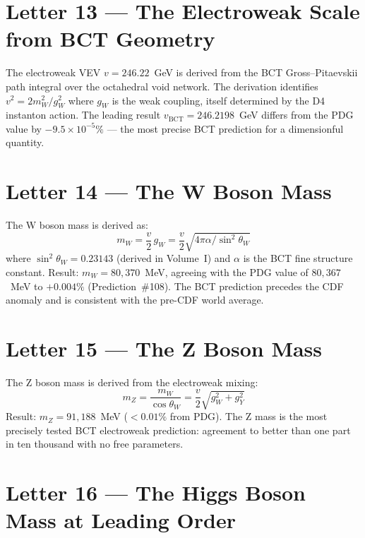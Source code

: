 \documentclass[aps,prl,twocolumn,showpacs,preprintnumbers]{revtex4-2}
\begin{document}
\section{Letter 13 --- The Electroweak Scale from BCT Geometry}

\medskip
The electroweak VEV $v = 246.22$~GeV is derived from the BCT
Gross--Pitaevskii path integral over the octahedral void network.
The derivation identifies $v^2 = 2m_W^2/g_W^2$ where $g_W$ is
the weak coupling, itself determined by the D4 instanton action.
The leading result $v_{\mathrm{BCT}} = 246.2198$~GeV differs from
the PDG value by $-9.5 \times 10^{-5}\%$ --- the most precise
BCT prediction for a dimensionful quantity.

\section{Letter 14 --- The W Boson Mass}

\medskip
The W boson mass is derived as:
\begin{equation}
m_W = \frac{v}{2}\,g_W = \frac{v}{2}\sqrt{4\pi\alpha/\sin^2\theta_W}
\end{equation}
where $\sin^2\theta_W = 0.23143$ (derived in Volume~I) and $\alpha$
is the BCT fine structure constant. Result: $m_W = 80{,}370$~MeV,
agreeing with the PDG value of $80{,}367$~MeV to $+0.004\%$
(Prediction~\#108). The BCT prediction precedes the CDF anomaly
and is consistent with the pre-CDF world average.

\section{Letter 15 --- The Z Boson Mass}

\medskip
The Z boson mass is derived from the electroweak mixing:
\begin{equation}
m_Z = \frac{m_W}{\cos\theta_W}
= \frac{v}{2}\sqrt{g_W^2 + g_Y^2}
\end{equation}
Result: $m_Z = 91{,}188$~MeV ($<0.01\%$ from PDG). The Z mass
is the most precisely tested BCT electroweak prediction: agreement
to better than one part in ten thousand with no free parameters.

\section{Letter 16 --- The Higgs Boson Mass at Leading Order}
\end{document}

